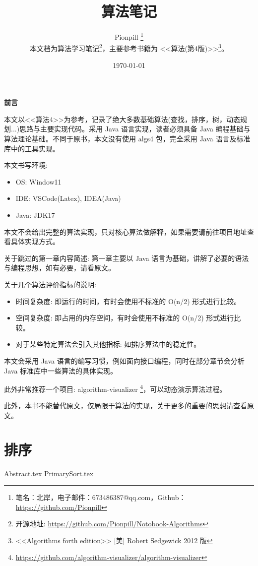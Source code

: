 \documentclass{PionpillNote-book}
\title{算法笔记}
\author{
    Pionpill \footnote{笔名：北岸，电子邮件：673486387@qq.com，Github：\url{https://github.com/Pionpill}} \\
    本文档为算法学习笔记\footnote{开源地址: \url{https://github.com/Pionpill/Notobook-Algorithms}}，主要参考书籍为 <<算法(第4版)>>\footnote{<<Algorithms forth edition>> [美] Robert Sedgewick 2012 版}。
}
\date{\today}
\begin{document}
\pagestyle{plain}
\maketitle

\noindent\textbf{前言}

本文以<<算法4>>为参考，记录了绝大多数基础算法(查找，排序，树，动态规划...)思路与主要实现代码。采用 Java 语言实现，读者必须具备 Java 编程基础与算法理论基础。不同于原书，本文没有使用 algs4 包，完全采用 Java 语言及标准库中的工具实现。

本文书写环境:
\begin{itemize}
    \item OS: Window11
    \item IDE: VSCode(Latex), IDEA(Java)
    \item Java: JDK17
\end{itemize}

本文不会给出完整的算法实现，只对核心算法做解释，如果需要请前往项目地址查看具体实现方式。

关于跳过的第一章内容简述: 第一章主要以 Java 语言为基础，讲解了必要的语法与编程思想，如有必要，请看原文。

关于几个算法评价指标的说明:

\begin{itemize}
    \item 时间复杂度: 即运行的时间，有时会使用不标准的 O(n/2) 形式进行比较。
    \item 空间复杂度: 即占用的内存空间，有时会使用不标准的 O(n/2) 形式进行比较。
    \item 对于某些特定算法会引入其他指标: 如排序算法中的稳定性。
\end{itemize}

本文会采用 Java 语言的编写习惯，例如面向接口编程，同时在部分章节会分析 Java 标准库中一些算法的具体实现。

此外非常推荐一个项目: algorithm-visualizer
\footnote{\url{https://github.com/algorithm-visualizer/algorithm-visualizer}}，可以动态演示算法过程。

此外，本书不能替代原文，仅局限于算法的实现，关于更多的重要的思想请查看原文。

\newpage

\tableofcontents

\newpage

\setcounter{page}{1} 
\pagestyle{fancy}

\chapter{排序}
{Abstract.tex}
{PrimarySort.tex}
\end{document}
